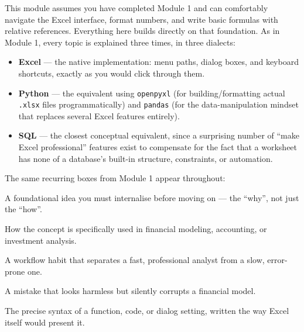 \documentclass[11pt,a4paper]{article}
\begin{document}
This module assumes you have completed Module 1 and can comfortably navigate the Excel interface, format numbers, and write basic formulas with relative references. Everything here builds directly on that foundation. As in Module 1, every topic is explained three times, in three dialects:

\begin{itemize}
  \item \textbf{Excel} --- the native implementation: menu paths, dialog boxes, and keyboard shortcuts, exactly as you would click through them.
  \item \textbf{Python} --- the equivalent using \texttt{openpyxl} (for building/formatting actual \texttt{.xlsx} files programmatically) and \texttt{pandas} (for the data-manipulation mindset that replaces several Excel features entirely).
  \item \textbf{SQL} --- the closest conceptual equivalent, since a surprising number of ``make Excel professional'' features exist to compensate for the fact that a worksheet has none of a database's built-in structure, constraints, or automation.
\end{itemize}

The same recurring boxes from Module 1 appear throughout:

\begin{keyconcept}
A foundational idea you must internalise before moving on --- the ``why'', not just the ``how''.
\end{keyconcept}

\begin{financeapp}
How the concept is specifically used in financial modeling, accounting, or investment analysis.
\end{financeapp}

\begin{protip}
A workflow habit that separates a fast, professional analyst from a slow, error-prone one.
\end{protip}

\begin{pitfall}
A mistake that looks harmless but silently corrupts a financial model.
\end{pitfall}

\begin{formulasyntax}
The precise syntax of a function, code, or dialog setting, written the way Excel itself would present it.
\end{formulasyntax}

\end{document}
